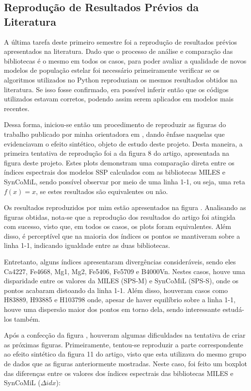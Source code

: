 \documentclass[12pt]{projeto}
\begin{document}
\subsection{Reprodução de Resultados Prévios da Literatura}
A última tarefa deste primeiro semestre foi a reprodução de resultados prévios apresentados na literatura. Dado que o processo de análise e comparação das bibliotecas é o mesmo em todos os casos, para poder avaliar a qualidade de novos modelos de população estelar foi necessário primeiramente verificar se os algoritmos utilizados no Python reproduziam os mesmos resultados obtidos na literatura. Se isso fosse confirmado, era possível inferir então que os códigos utilizados estavam corretos, podendo assim serem aplicados em modelos mais recentes.

Dessa forma, iniciou-se então um procedimento de reproduzir as figuras do trabalho publicado por minha orientadora em \cite{Paula2020}, dando ênfase naquelas que evidenciavam o efeito sintético, objeto de estudo deste projeto. Desta maneira, a primeira tentativa de reprodução foi a da figura 8 do artigo, apresentada na figura  deste projeto. Estes plots demonstram uma comparação direta entre os índices espectrais dos modelos SSP calculados com as bibliotecas MILES  e SynCoMiL, sendo possível observar por meio de uma linha 1-1, ou seja, uma reta \(f(x) = x\), se estes resultados são equivalentes ou não.



Os resultados reproduzidos por mim estão apresentados na figura .
Analisando as figuras obtidas, nota-se que a reprodução dos resultados do artigo foi atingida com sucesso, visto que, em todos os casos, os plots foram equivalentes. Além disso, é perceptível que na maioria dos índices os pontos se mantiveram sobre a linha 1-1, indicando igualdade entre as duas bibliotecas. 

Entretanto, alguns índices apresentaram divergências consideráveis, sendo eles Ca4227, Fe4668, Mg1, Mg2, Fe5406, Fe5709 e B4000Vn. Nestes casos, houve uma disparidade entre os valores da MILES (SPS-M) e SynCoMiL (SPS-S), onde os pontos acabaram distoando da linha 1-1. Além disso, houveram casos como H83889, H93885 e H103798 onde, apesar de haver equilíbrio sobre a linha 1-1, houve uma dispersão maior dos pontos em torno dela, sendo interessante estudá-los também. 


Após a confecção da figura , houveram algumas dificuldades na tentativa de criar as próximas figuras. Primeiramente, tentou-se reproduzir a parte correspondente ao efeito sintético da figura 11 do artigo, visto que esta utilizava do mesmo grupo de dados que as figuras anteriormente mostradas. Neste caso, foi feito um boxplot das diferenças entre os valores dos índices espectrais das bibliotecas MILES e SynCoMiL (\(\Delta idx\)):
\end{document}
